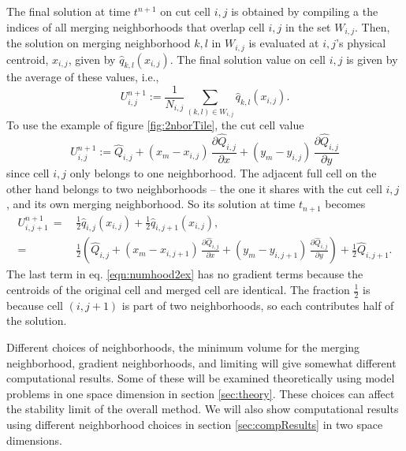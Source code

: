 \begin{enumerate}
\vspace*{.1in}
The final solution at time $t^{n+1}$ on cut cell $i,j$ is obtained by compiling a the indices of all merging neighborhoods that overlap cell $i,j$ in the set $W_{i,j}$.  Then, the solution on merging neighborhood $k,l$ in $W_{i,j}$ is evaluated at $i,j$'s physical centroid, $x_{i,j}$, given by $\hat{q}_{k,l}(x_{i,j})$.  The final solution value on cell $i,j$ is given by the average of these values, i.e.,
\begin{equation} \label{eq:final_update_linear}
U^{n+1}_{i,j} := \frac{1}{N_{i,j}}\sum_{(k,l) \in W_{i,j}}\hat{q}_{k,l}(x_{i,j}).
\end{equation}
To use the example of figure \ref{fig:2nborTile}, the cut cell value
\begin{equation}
   U_{i,j}^{n+1} := \widehat{Q}_{i,j} 
   + (x_m - x_{i,j}) \, \frac{\partial \widehat{Q}_{i,j}}{\partial x} 
   + (y_m - y_{i,j}) \, \frac{\partial \widehat{Q}_{i,j}}{\partial y}
\end{equation}
since cell ${i,j}$ only belongs to one neighborhood. The adjacent full cell
on the other hand belongs to two neighborhoods -- the one it shares with
the cut cell $i,j$ , and its own merging neighborhood.
So its solution at time $t_{n+1}$  becomes
\begin{equation}
\label{eqn:numhood2ex}
\begin{split}
   U_{i,j+1}^{n+1} \,=\, & \frac{1}{2}\widehat{q}_{i,j}(x_{i,j})+ \frac{1}{2} \widehat{q}_{i,j+1}(x_{i,j}), \\
   = &\frac{1}{2} \left
   (\widehat{Q}_{i,j} 
   + (x_m - x_{i,j+1}) \, \frac{\partial \widehat{Q}_{i,j}}{\partial x} 
   + (y_m - y_{i,j+1}) \, \frac{\partial \widehat{Q}_{i,j}}{\partial y} \right ) + \frac{1}{2} \widehat{Q}_{i,j+1} .
\end{split}
\end{equation}
The last term  in eq. \eqref{eqn:numhood2ex} has no gradient terms because the
centroids of the original cell and merged cell are identical.
The fraction $\frac{1}{2}$ is because cell $(i,j+1)$ is part of  two
neighborhoods, so each contributes half of the solution.
\end{enumerate}

Different choices of neighborhoods, the minimum volume for the merging
neighborhood, gradient neighborhoods, and limiting will give
somewhat different computational results. Some of these will be examined
theoretically using model problems in one space dimension in section
\ref{sec:theory}. These choices can affect the stability limit of the
overall method.
We will also show computational results using different neighborhood
choices in section \ref{sec:compResults} in two space dimensions.

